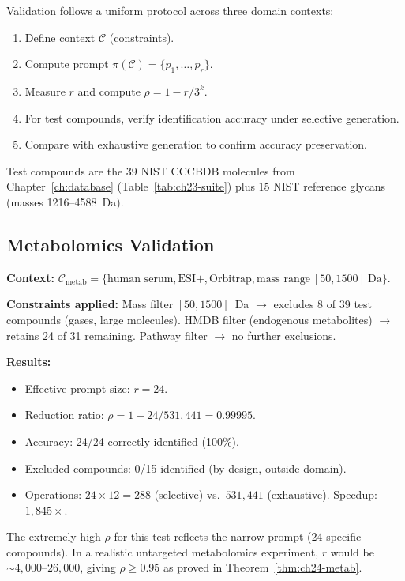 Validation follows a uniform protocol across three domain contexts:
\begin{enumerate}
  \item[\textbf{V1:}] Define context $\mathcal{C}$ (constraints).
  \item[\textbf{V2:}] Compute prompt $\pi(\mathcal{C}) = \{p_1, \ldots, p_r\}$.
  \item[\textbf{V3:}] Measure $r$ and compute $\rho = 1 - r/3^k$.
  \item[\textbf{V4:}] For test compounds, verify identification accuracy under
    selective generation.
  \item[\textbf{V5:}] Compare with exhaustive generation to confirm accuracy
    preservation.
\end{enumerate}
Test compounds are the 39 NIST CCCBDB molecules from Chapter~\ref{ch:database}
(Table~\ref{tab:ch23-suite}) plus 15 NIST reference glycans (masses
1216--4588~Da).

\subsection{Metabolomics Validation}
\label{sec:ch24-metab-val}

\noindent\textbf{Context:}
$\mathcal{C}_{\mathrm{metab}} = \{\text{human serum}, \text{ESI+},
\text{Orbitrap}, \text{mass range}~[50,1500]~\text{Da}\}$.

\noindent\textbf{Constraints applied:}
Mass filter $[50,1500]$~Da $\to$ excludes 8 of 39 test compounds (gases, large
molecules).  HMDB filter (endogenous metabolites) $\to$ retains 24 of 31
remaining.  Pathway filter $\to$ no further exclusions.

\noindent\textbf{Results:}
\begin{itemize}[noitemsep]
  \item Effective prompt size: $r = 24$.
  \item Reduction ratio: $\rho = 1 - 24/531{,}441 = 0.99995$.
  \item Accuracy: 24/24 correctly identified (100\%).
  \item Excluded compounds: 0/15 identified (by design, outside domain).
  \item Operations: $24 \times 12 = 288$ (selective)
    vs.\ $531{,}441$ (exhaustive).  Speedup: $1{,}845\times$.
\end{itemize}

\begin{remark}
The extremely high $\rho$ for this test reflects the narrow prompt (24 specific
compounds).  In a realistic untargeted metabolomics experiment, $r$ would be
$\sim 4{,}000$--$26{,}000$, giving $\rho \geq 0.95$ as proved in
Theorem~\ref{thm:ch24-metab}.
\end{remark}

